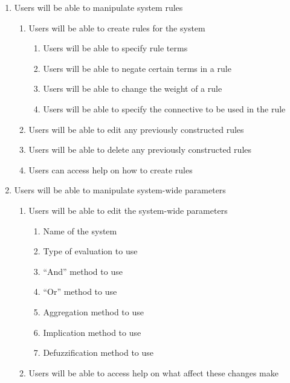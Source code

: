 \begin{enumerate}
\item Users will be able to manipulate system rules
	\begin{enumerate}[label*=\arabic*.]
		\item Users will be able to create rules for the system
		\begin{enumerate}[label*=\arabic*.]
			\item Users will be able to specify rule terms
			\item Users will be able to negate certain terms in a rule
			\item Users will be able to change the weight of a rule
			\item Users will be able to specify the connective to be used in the rule
		\end{enumerate}
		\item Users will be able to edit any previously constructed rules
		\item Users will be able to delete any previously constructed rules
		\item Users can access help on how to create rules
	\end{enumerate}		

\item Users will be able to manipulate system-wide parameters
	\begin{enumerate}[label*=\arabic*.]
		\item Users will be able to edit the system-wide parameters
		\begin{enumerate}[label*=\arabic*.]
			\item Name of the system
			\item Type of evaluation to use
			\item ``And'' method to use
			\item ``Or'' method to use
			\item Aggregation method to use
			\item Implication method to use
			\item Defuzzification method to use		
		\end{enumerate}
		\item Users will be able to access help on what affect these changes make
	\end{enumerate}


\end{enumerate}
